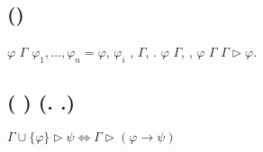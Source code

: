 \subsection{\textcyr{\CYRO\cyrp\cyrr\cyre\cyrd\cyre\cyrl\cyre\cyrn\cyri\cyre}
(\textcyr{\CYRV\cyrery\cyrv\cyro\cyrd})}

\textbf{\textcyr{\CYRV\cyrery\cyrv\cyro\cyrd\cyro\cyrm} }$\varphi$
\textcyr{\cyri\cyrz} $\Gamma$ \textcyr{\cyrn\cyra\cyrz\cyrery\cyrv\cyra\cyre\cyrt\cyrs\cyrya}
\textcyr{\cyrp\cyro\cyrs\cyrl\cyre\cyrd\cyro\cyrv\cyra\cyrt\cyre\cyrl\cyrsftsn\cyrn\cyro\cyrs\cyrt\cyrsftsn}
$\varphi_{1},\dots,\varphi_{n}=\varphi$, \textcyr{\cyrv} \textcyr{\cyrk\cyro\cyrt\cyro\cyrr\cyro\cyrishrt}
\textcyr{\cyrk\cyra\cyrzh\cyrd\cyra\cyrya} $\varphi_{i}$ \textcyr{\cyrya\cyrv\cyrl\cyrya\cyre\cyrt\cyrs\cyrya}
\textcyr{\cyra\cyrk\cyrs\cyri\cyro\cyrm\cyro\cyrishrt}, \textcyr{\cyrl\cyri\cyrb\cyro}
\textcyr{\cyrp\cyrr\cyri\cyrn\cyra\cyrd\cyrl\cyre\cyrzh\cyri\cyrt}
\textcyr{\cyrm\cyrn\cyro\cyrzh\cyre\cyrs\cyrt\cyrv\cyru} $\Gamma$,
\textcyr{\cyrl\cyri\cyrb\cyro} \textcyr{\cyrp\cyro\cyrl\cyru\cyrch\cyre\cyrn\cyra}
\textcyr{\cyri\cyrz} \textcyr{\cyrp\cyrr\cyre\cyrd\cyrery\cyrd\cyru\cyrshch\cyri\cyrh}
\textcyr{\cyro\cyrd\cyrn\cyro\cyrk\cyrr\cyra\cyrt\cyrn\cyrery\cyrm}
\textcyr{\cyrp\cyrr\cyri\cyrm\cyre\cyrn\cyre\cyrn\cyri\cyre\cyrm}
\textcyr{\cyrp\cyrr\cyra\cyrv\cyri\cyrl} \textcyr{\cyrv\cyrery\cyrv\cyro\cyrd\cyra}.
\textcyr{\CYRE\cyrs\cyrl\cyri} \textcyr{\cyrs\cyru\cyrshch\cyre\cyrs\cyrt\cyrv\cyru\cyre\cyrt}
\textcyr{\cyrv\cyrery\cyrv\cyro\cyrd} $\varphi$ \textcyr{\cyri\cyrz}
$\Gamma$, \textcyr{\cyrt\cyro} \textcyr{\cyrg\cyro\cyrv\cyro\cyrr\cyrya\cyrt},
\textcyr{\cyrch\cyrt\cyro} $\varphi$ \textcyr{\cyrv\cyrery\cyrv\cyro\cyrd\cyri\cyrm\cyra}
\textcyr{\cyri\cyrz} $\Gamma$ \textcyr{\cyri} \textcyr{\cyro\cyrb\cyro\cyrz\cyrn\cyra\cyrch\cyra\cyryu\cyrt}
$\Gamma\vartriangleright\varphi$.

\subsection{\textcyr{\CYRT\cyre\cyro\cyrr\cyre\cyrm\cyra} (\textcyr{\cyro} \textcyr{\cyrd\cyre\cyrd\cyru\cyrk\cyrc\cyri\cyri})
(\textcyr{\cyrb}. \textcyr{\cyrd}.)}

$\Gamma\cup\{\varphi\}\vartriangleright\psi\Leftrightarrow\Gamma\vartriangleright(\varphi\rightarrow\psi)$

\subsection{\textcyr{\CYRS\cyrl\cyre\cyrd\cyrs\cyrt\cyrv\cyri\cyre}}

